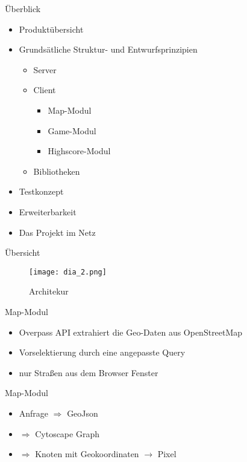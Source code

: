 \documentclass{beamer}
\begin{document}
\begin{frame}{Überblick}
\begin{itemize}
\item Produktübersicht
\item Grundsätliche Struktur- und Entwurfsprinzipien
\begin{itemize}
\item Server
\item Client
\begin{itemize}
\item Map-Modul
\item Game-Modul
\item Highscore-Modul
\end{itemize}
\item Bibliotheken
\end{itemize}
\item Testkonzept
\item Erweiterbarkeit
\item Das Projekt im Netz
\end{itemize}
\end{frame}

\begin{frame}{Übersicht}
\begin{figure}[htb]
  \centering
  \texttt{[image: dia\_2.png]}
\caption{Architekur}
  \label{arch}
\end{figure} 
\end{frame}


\begin{frame}{Map-Modul}
\begin{itemize}
\item Overpass API extrahiert die Geo-Daten aus OpenStreetMap
\item Vorselektierung durch eine angepasste Query 
\item nur Straßen aus dem Browser Fenster
\end{itemize}
\end{frame}


\begin{frame}{Map-Modul}
\begin{itemize}
\item Anfrage $\Rightarrow$ GeoJson
\item $\Rightarrow$ Cytoscape Graph
\item $\Rightarrow$ Knoten mit Geokoordinaten $\rightarrow$ Pixel

\end{itemize}
\end{frame}
\end{document}
